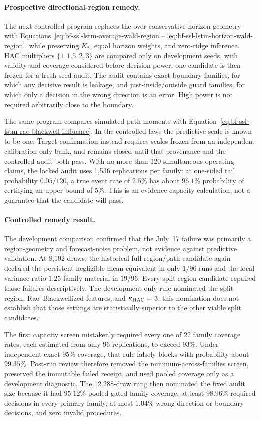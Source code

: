 \paragraph{Prospective directional-region remedy.}
The next controlled program replaces the over-conservative horizon geometry
with Equations~\eqref{eq:bf-ssl-lstm-average-wald-region}--
\eqref{eq:bf-ssl-lstm-horizon-wald-region}, while preserving $K_*$, equal
horizon weights, and zero-ridge inference.  HAC multipliers
$\{1,1.5,2,3\}$ are compared only on development seeds, with validity and
coverage considered before decision power; one candidate is then frozen for a
fresh-seed audit.  The audit contains exact-boundary families, for which any
decisive result is leakage, and just-inside/outside guard families, for which
only a decision in the wrong direction is an error.  High power is not
required arbitrarily close to the boundary.

The same program compares simulated-path moments with
Equation~\eqref{eq:bf-ssl-lstm-rao-blackwell-influence}.  In the controlled
laws the predictive scale is known to be one.  Target confirmation instead
requires scales frozen from an independent calibration-only bank, and remains
closed until that provenance and the controlled audit both pass.  With no more
than 120 simultaneous operating claims, the locked audit uses 1,536
replications per family: at one-sided tail probability $0.05/120$, a true
event rate of $2.5\%$ has about $96.1\%$ probability of certifying an upper
bound of $5\%$.  This is an evidence-capacity calculation, not a guarantee that
the candidate will pass.

\paragraph{Controlled remedy result.}
The development comparison confirmed that the July~17 failure was primarily a
region-geometry and forecast-noise problem, not evidence against predictive
validation.  At 8,192 draws, the historical full-region/path candidate again
declared the persistent negligible mean equivalent in only $1/96$ runs and the
local variance-ratio-$1.25$ family material in $19/96$.  Every split-region
candidate repaired those failures descriptively.  The development-only rule
nominated the split region, Rao--Blackwellized features, and
$\kappa_{\rm HAC}=3$; this nomination does not establish that those settings
are statistically superior to the other viable split candidates.

The first capacity screen mistakenly required every one of 22 family coverage
rates, each estimated from only 96 replications, to exceed $93\%$.  Under
independent exact $95\%$ coverage, that rule falsely blocks with probability
about $99.35\%$.  Post-run review therefore removed the minimum-across-families
screen, preserved the immutable failed receipt, and used pooled coverage only
as a development diagnostic.  The 12,288-draw rung then nominated the fixed
audit size because it had $95.12\%$ pooled gated-family coverage, at least
$98.96\%$ required decisions in every primary family, at most $1.04\%$
wrong-direction or boundary decisions, and zero invalid procedures.

